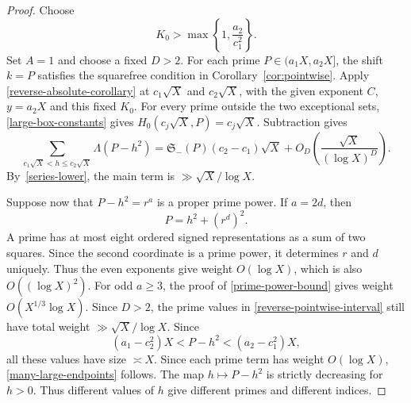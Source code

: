 \documentclass[12pt,reqno]{amsart}
\numberwithin{equation}{section}
\theoremstyle{plain}
\theoremstyle{remark}
\begin{document}
\begin{proof}
Choose
\begin{equation*}\label{large-box-K0}
 K_0>\max\left\{1,\frac{a_2}{c_1^2}\right\}.
\end{equation*}
Set $A=1$ and choose a fixed $D>2$. For each prime $P\in(a_1X,a_2X]$, the shift $k=P$ satisfies
the squarefree condition in Corollary~\ref{cor:pointwise}. Apply
\eqref{reverse-absolute-corollary} at $c_1\sqrt X$ and
$c_2\sqrt X$, with the given exponent $C$, $y=a_2X$ and this fixed $K_0$.  For every prime
outside the two exceptional sets, \eqref{large-box-constants} gives
$H_0(c_j\sqrt X,P)=c_j\sqrt X$.  Subtraction gives
\begin{equation}\label{reverse-pointwise-interval}
 \sum_{c_1\sqrt X<h\leq c_2\sqrt X}
  \Lambda(P-h^2)
=\mathfrak S_-(P)(c_2-c_1)\sqrt X
  +O_D\left(\frac{\sqrt X}{(\log X)^D}\right).
\end{equation}
By~\eqref{series-lower}, the main term is $\gg\sqrt X/\log X$.

Suppose now that $P-h^2=r^a$ is a proper prime power.
If $a=2d$, then
\[
 P=h^2+(r^d)^2.
\]
A prime has at most eight ordered signed representations as a sum of
two squares.  Since the second coordinate is a prime power, it
determines $r$ and $d$ uniquely.  Thus the even exponents give
weight $O(\log X)$, which is also $O((\log X)^2)$.  For odd
$a\geq3$, the proof of \eqref{prime-power-bound} gives weight
$O(X^{1/3}\log X)$.  Since $D>2$, the prime values in
\eqref{reverse-pointwise-interval} still have total weight
$\gg\sqrt X/\log X$.
Since
\[
 (a_1-c_2^2)X<P-h^2<(a_2-c_1^2)X,
\]
all these values have size $\asymp X$.  Since each prime term has weight $O(\log X)$,
\eqref{many-large-endpoints} follows.  The map $h\mapsto P-h^2$ is
strictly decreasing for $h>0$.  Thus different values of $h$ give
different primes and different indices.
\end{proof}
\end{document}
